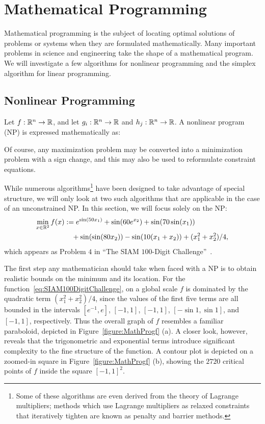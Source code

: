 \chapter{Mathematical Programming}\label{chapter:MathematicalProgramming}

Mathematical programming is the subject of locating optimal solutions of problems or systems when they are formulated mathematically. Many important problems in science and engineering take the shape of a mathematical program. We will investigate a few algorithms for nonlinear programming and the simplex algorithm for linear programming.

\section{Nonlinear Programming}

Let $f:\mathbb{R}^n\to\mathbb{R}$, and let $g_i:\mathbb{R}^n\to\mathbb{R}$ and $h_j:\mathbb{R}^n\to\mathbb{R}$. A nonlinear program (NP) is expressed mathematically as:

Of course, any maximization problem may be converted into a minimization problem with a sign change, and this may also be used to reformulate constraint equations.

While numerous algorithms\footnote{Some of these algorithms are even derived from the theory of Lagrange multipliers; methods which use Lagrange multipliers as relaxed constraints that iteratively tighten are known as penalty and barrier methods.} have been designed to take advantage of special structure, we will only look at two such algorithms that are applicable in the case of an unconstrained NP. In this section, we will focus solely on the NP:
\begin{align}
\min_{x\in\mathbb{R}^2} f(x) & := e^{\sin(50x_1)} + \sin(60e^{x_2}) + \sin(70\sin(x_1))\nonumber\\
&\quad + \sin(\sin(80x_2)) - \sin(10(x_1+x_2)) + (x_1^2 + x_2^2)/4,\label{eq:SIAM100DigitChallenge}
\end{align}
which appears as Problem $4$ in ``The SIAM $100$-Digit Challenge''~\cite{Bornemann-Laurie-Wagon-Waldvogel-04}.

The first step any mathematician should take when faced with a NP is to obtain realistic bounds on the minimum and its location. For the function~\eqref{eq:SIAM100DigitChallenge}, on a global scale $f$ is dominated by the quadratic term $(x_1^2+x_2^2)/4$, since the values of the first five terms are all bounded in the intervals $[e^{-1},e]$, $[-1,1]$, $[-1,1]$, $[-\sin1,\sin1]$, and $[-1,1]$, respectively. Thus the overall graph of $f$ resembles a familiar paraboloid, depicted in Figure~\ref{figure:MathProgf} (a). A closer look, however, reveals that the trigonometric and exponential terms introduce significant complexity to the fine structure of the function. A contour plot is depicted on a zoomed-in square in Figure~\ref{figure:MathProgf} (b), showing the $2720$ critical points of $f$ inside the square $[-1,1]^2$.

